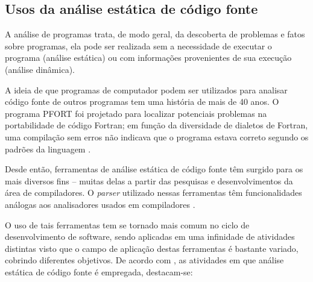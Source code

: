 \subsection{Usos da análise estática de código fonte} \label{usos}

A análise de programas trata, de modo geral, da descoberta de problemas e
fatos sobre programas, ela pode ser realizada sem a necessidade de executar o
programa (análise estática) ou com informações provenientes de sua execução
(análise dinâmica).

A ideia de que programas de computador podem ser utilizados para analisar
código fonte de outros programas tem uma história de mais de 40 anos.  O
programa PFORT \cite{Ryder1974} foi projetado para localizar potenciais
problemas na portabilidade de código Fortran; em função da diversidade de
dialetos de Fortran, uma compilação sem erros não indicava que o programa
estava correto segundo os padrões da linguagem \cite{Wichmann1995}.

Desde então, ferramentas de análise estática de código fonte têm surgido para
os mais diversos fins -- muitas delas a partir das pesquisas e
desenvolvimentos da área de compiladores.  O {\it parser} utilizado nessas
ferramentas têm funcionalidades análogas aos analisadores usados em
compiladores \cite{Anderson2008}.

O uso de tais ferramentas tem se
tornado mais comum no ciclo de desenvolvimento de
software, sendo aplicadas em uma infinidade de atividades distintas visto que o
campo de aplicação destas ferramentas é bastante variado, cobrindo diferentes
objetivos. De acordo com , as atividades em que análise
estática de código fonte é empregada, destacam-se:


